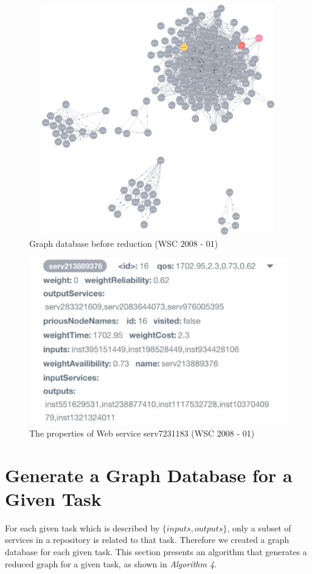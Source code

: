 \begin{figure}[H]
\includegraphics[width = 13cm, height = 10cm, scale = 0.5]{svg-before-reduce.pdf}
\centering
\caption{Graph database before reduction (WSC 2008 - 01)}
\label{fig:beforeReduction} 
\end{figure} 

\begin{figure}[H]
\includegraphics[scale = 0.6]{The-properties-of-Web-service-serv213889376.pdf}
\centering
\caption{The properties of Web service serv7231183 (WSC 2008 - 01)}
\label{fig:servProp} 
\end{figure} 

\section{Generate a Graph Database for a Given Task}
For each given task which is described by $\{inputs, outputs\}$, only a subset of services in a repository is related to that task. Therefore we created a graph database for each given task. This section presents an algorithm that generates a reduced graph for a given task, as shown in \emph{Algorithm 4}. \\

